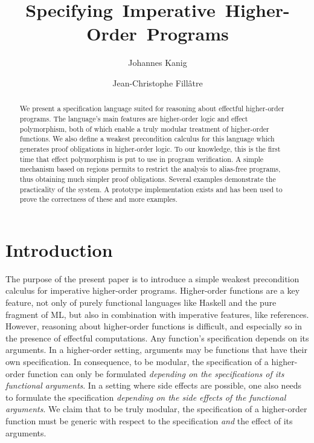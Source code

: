 \documentclass[a4paper]{llncs}
\begin{document}
\title{\mbox{Specifying Imperative Higher-Order Programs}}

\author{Johannes Kanig \and Jean-Christophe
Fill\^atre}

% 


\maketitle

\begin{abstract} We present a specification language suited for reasoning
  about effectful higher-order programs. The language's main features are
  higher-order logic and effect polymorphism, both of which enable a truly
  modular treatment of higher-order functions.  We also define a weakest
  precondition calculus for this language which generates proof obligations in
  higher-order logic.  To our knowledge, this is the first time that effect
  polymorphism is put to use in program verification.  A simple mechanism
  based on regions permits to restrict the analysis to alias-free programs,
  thus obtaining much simpler proof obligations. Several examples demonstrate
  the practicality of the system. A prototype implementation exists and has
  been used to prove the correctness of these and more examples.
\end{abstract}

\section{Introduction}

The purpose of the present paper is to introduce a simple weakest precondition
calculus for imperative higher-order programs. Higher-order functions are a
key feature, not only of purely functional languages like Haskell and the pure
fragment of ML, but also in combination with imperative features, like
references. However, reasoning about higher-order functions is difficult, and
especially so in the presence of effectful computations. Any function's
specification depends on its arguments. In a higher-order setting, arguments
may be functions that have their own specification. In consequence, to be
modular, the specification of a higher-order function can only be formulated
{\em depending on the specifications of its functional arguments}. In a
setting where side effects are possible, one also needs to formulate the
specification {\em depending on the side effects of the functional arguments}.
We claim that to be truly modular, the specification of a higher-order
function must be generic with respect to the specification {\em and} the
effect of its arguments.
\end{document}
